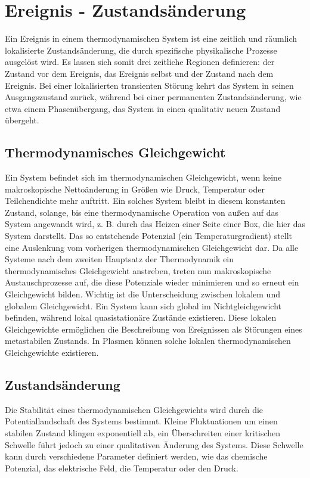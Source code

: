 \section{Ereignis - Zustandsänderung}
\label{sec:theory-event}

Ein Ereignis in einem thermodynamischen System ist eine zeitlich und räumlich lokalisierte Zustandsänderung, die durch spezifische physikalische Prozesse ausgelöst wird. Es lassen sich somit drei zeitliche Regionen definieren: der Zustand vor dem Ereignis, das Ereignis selbst und der Zustand nach dem Ereignis. Bei einer lokalisierten transienten Störung kehrt das System in seinen Ausgangszustand zurück, während bei einer permanenten Zustandsänderung, wie etwa einem Phasenübergang, das System in einen qualitativ neuen Zustand übergeht.

\subsection{Thermodynamisches Gleichgewicht}
Ein System befindet sich im thermodynamischen Gleichgewicht, wenn keine makroskopische Nettoänderung in Größen wie Druck, Temperatur oder Teilchendichte mehr auftritt. Ein solches System bleibt in diesem konstanten Zustand, solange, bis eine thermodynamische Operation von außen auf das System angewandt wird, z. B. durch das Heizen einer Seite einer Box, die hier das System darstellt. Das so entstehende Potenzial (ein Temperaturgradient) stellt eine Auslenkung vom vorherigen thermodynamischen Gleichgewicht dar. Da alle Systeme nach dem zweiten Hauptsatz der Thermodynamik ein thermodynamisches Gleichgewicht anstreben, treten nun makroskopische Austauschprozesse auf, die diese Potenziale wieder minimieren und so erneut ein Gleichgewicht bilden.
Wichtig ist die Unterscheidung zwischen lokalem und globalem Gleichgewicht. Ein System kann sich global im Nichtgleichgewicht befinden, während lokal quasistationäre Zustände existieren. Diese lokalen Gleichgewichte ermöglichen die Beschreibung von Ereignissen als Störungen eines metastabilen Zustands. In Plasmen können solche lokalen thermodynamischen Gleichgewichte existieren. \cite{Lieberman2005}

\subsection{Zustandsänderung}
Die Stabilität eines thermodynamischen Gleichgewichts wird durch die Potentiallandschaft des Systems bestimmt. Kleine Fluktuationen um einen stabilen Zustand klingen exponentiell ab, ein Überschreiten einer kritischen Schwelle führt jedoch zu einer qualitativen Änderung des Systems. Diese Schwelle kann durch verschiedene Parameter definiert werden, wie das chemische Potenzial, das elektrische Feld, die Temperatur oder den Druck.

